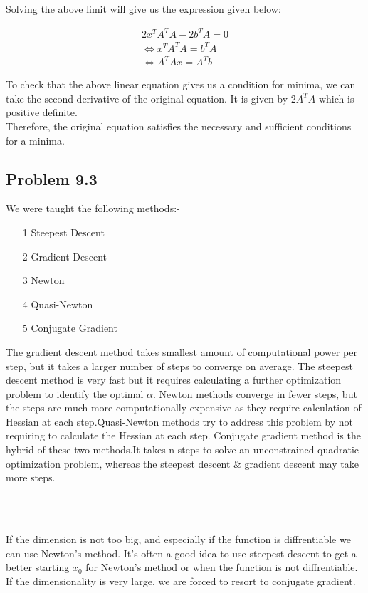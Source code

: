 \documentclass[letterpaper,12pt]{article}
\theoremstyle{definition}
\begin{document}
\begin{flushleft}
Solving the above limit will give us the expression given below:
\end{flushleft}

\begin{align*}
2x^TA^TA - 2b^TA = 0 \\
\iff x^TA^TA = b^TA \\
\iff A^TAx = A^Tb
\end{align*}
\begin{flushleft}
To check that the above linear equation gives us a  condition for minima, we can take the second derivative of the original equation. It is given by $ 2A^TA $ which is positive definite.\\
\vspace{2mm}
Therefore, the original equation satisfies the necessary and sufficient conditions for a minima. 
\end{flushleft}
\subsection*{Problem 9.3}

We were taught the following methods:-
\begin{itemize}
    \item[1] Steepest Descent
\item[2] Gradient Descent
\item[3] Newton
\item[4] Quasi-Newton
\item[5] Conjugate Gradient
\end{itemize}

\begin{flushleft}
The gradient descent method takes smallest amount of computational power per step, but it takes a larger number of steps to converge on average. The steepest descent method is very fast but it requires calculating a further optimization problem to identify the optimal $\alpha$. Newton methods converge in fewer steps, but the steps are much more computationally expensive as they require calculation of Hessian at each step.Quasi-Newton methods try to address this problem by not requiring to calculate the Hessian at each step.  Conjugate gradient method is the hybrid of these  two methods.It takes n steps to solve an unconstrained quadratic optimization problem, whereas the steepest descent & gradient descent may take more steps.
\end{flushleft}

\\
\\
\begin{flushleft}
If the dimension is not too big, and especially if the function is diffrentiable we can use Newton's method. It's often a good idea to use steepest descent to get a better starting $x_0$ for Newton's method or when the function is not diffrentiable. If the dimensionality is very large, we are forced to resort to conjugate gradient.
\end{flushleft}
\end{document}
